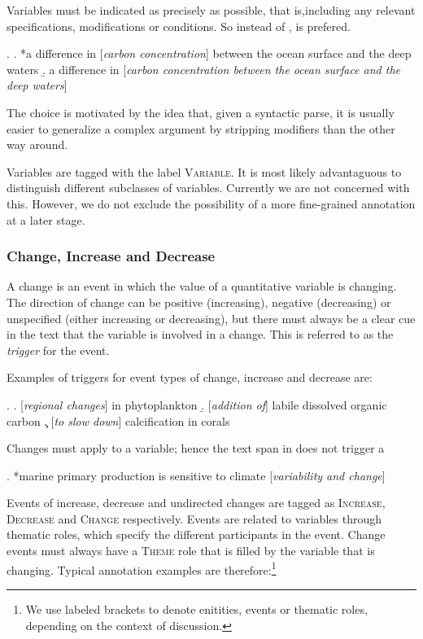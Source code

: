 \documentclass[10pt, a4paper]{article}
\newcommand{\tag}[1]{\textsc{#1}}
\begin{document}
Variables must be indicated as precisely as possible, that is,including any relevant specifications, modifications or conditions. So instead of \Next[a], \Next[b] is prefered.

\ex.
  \a. *a difference in [\emph{carbon concentration}] between the ocean surface and the deep waters
  \b. a difference in [\emph{carbon concentration between the ocean surface and the deep waters}]

The choice is motivated by the idea that, given a syntactic parse, it is usually easier to generalize a complex argument by stripping modifiers than the other way around.  

Variables are tagged with the label \tag{Variable}. It is most likely advantaguous to distinguish different subclasses of variables. Currently we are not concerned with this. 
However, we do not exclude the possibility of a more fine-grained annotation at a later stage. 


\subsubsection{Change, Increase and Decrease}

A change is an event in which the value of a quantitative variable is changing.
The direction of change can be positive (increasing), negative (decreasing) or unspecified (either increasing or decreasing), but there must always be a clear cue in the text that the variable is involved in a change.
This is referred to as the \emph{trigger} for the event.

Examples of triggers for event types of change, increase and decrease are:

\ex.
  \a. [\emph{regional changes}] in phytoplankton
  \b. [\emph{addition of}] labile dissolved organic carbon
  \c. [\emph{to slow down}] calcification in corals

Changes must apply to a variable; hence the text span in \Next does not trigger a

\ex. *marine primary production is sensitive to climate [\emph{variability and change}]

Events of increase, decrease and undirected changes are tagged as \tag{Increase}, \tag{Decrease} and \tag{Change} respectively. 
Events are related to variables through thematic roles, which specify the different participants in the event. 
Change events must always have a \tag{Theme} role that is filled by the variable that is changing.
Typical annotation examples are therefore:\footnote{We use labeled brackets to denote enitities, events or thematic roles, depending on the context of discussion.}
\end{document}

